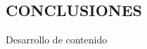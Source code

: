 \medspace
\vspace{1.5cm}
\begin{center}
	\section*{\large CONCLUSIONES}
\end{center}

\vspace{1cm}

Desarrollo de contenido